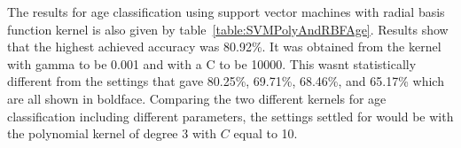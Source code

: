 \documentclass[a4paper]{llncs}
\begin{document}
The results for age classification using support vector machines with radial basis function kernel is also given by table~\ref{table:SVMPolyAndRBFAge}. Results show that the highest achieved accuracy was 80.92\%. It was obtained from the kernel with gamma to be 0.001 and with a C to be 10000. This wasnt statistically different from the settings that gave 80.25\%, 69.71\%, 68.46\%, and 65.17\% which are all shown in boldface. Comparing the two different kernels for age classification including different parameters, the settings settled for would be with the polynomial kernel of degree 3 with $C$ equal to 10.




\end{document}
